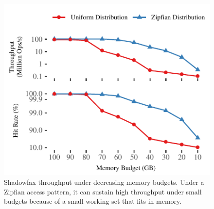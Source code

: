 \begin{figure}[t]
\centering
\includegraphics[width=\columnwidth]{graphs/memory-budget.pdf}
\caption{Shadowfax throughput under decreasing memory budgets. Under a
    Zipfian access pattern, it can sustain high throughput under
    small budgets because of a small working set that fits in memory.}
\label{fig:memory}
\end{figure}
